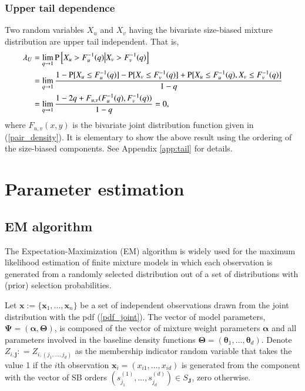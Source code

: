 \documentclass[eng]{csam}
\def\a{\alpha}
\def\mP{\text{P}}
\begin{document}
\subsubsection{Upper tail dependence}
Two random variables $X_u$ and $X_v$ having the bivariate size-biased mixture distribution are upper tail independent. That is,
\begin{align*}
\lambda_U &= \lim_{q\rightarrow 1}\mP\left[X_u > F^{-1}_u(q)\big{|}X_v > F^{-1}_v(q)\right]\\
&= \lim_{q\rightarrow 1}\frac{1- \mP[X_u \le F^{-1}_u(q)] - \mP[X_v \le F^{-1}_v(q)] + \mP[X_u \le F^{-1}_u(q), X_v \le F^{-1}_v(q)]}{1-q}\\
&= \lim_{q\rightarrow 1}\frac{1-2q + F_{u,v}(F^{-1}_u(q),F^{-1}_v(q))}{1-q} = 0,
\end{align*}
where $F_{u,v}(x,y)$ is the bivariate joint distribution function given in (\ref{pair_density}). It is elementary to show the above result using the ordering of the size-biased components. See Appendix \ref{app:tail} for details.


\section{Parameter estimation}\label{sec4}
\subsection{EM algorithm}\label{em}
The Expectation-Maximization (EM) algorithm \citep{dempster1977maximum} is widely used for the maximum likelihood estimation of finite mixture models in which each observation is generated from a randomly selected distribution out of a set of distributions with (prior) selection probabilities.

Let $\bm{x} := \{\bm{x}_1, \ldots, \bm{x}_n\}$ be a set of independent observations drawn from the joint distribution with the pdf (\ref{pdf_joint}). The vector of model parameters, $\bm{\Psi} = (\bm{\a}, \bm{\Theta})$, is composed of the vector of mixture weight parameters $\bm{\a}$ and all parameters involved in the baseline density functions $\bm{\Theta} = (\bm{\theta}_1,\ldots, \bm{\theta}_d)$. Denote $Z_{i,\bm{j}} : = Z_{i, (j_1,\ldots,j_d)}$ as the membership indicator random variable that takes the value 1 if the $i$th observation $\bm{x}_i = (x_{i1},\ldots,x_{id})$ is generated from the component with the vector of SB orders $(s^{(1)}_{j_1},\ldots, s^{(d)}_{j_d}) \in S_{\bm{J}}$, zero otherwise.
\end{document}
